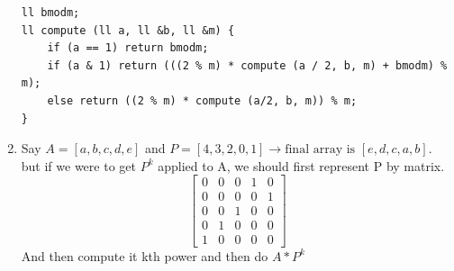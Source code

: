\documentclass[8pt, a4paper, oneside, twocolumn]{extarticle}
\begin{document}
\begin{enumerate}
\begin{verbatim}
ll bmodm;
ll compute (ll a, ll &b, ll &m) {
    if (a == 1) return bmodm;
    if (a & 1) return (((2 % m) * compute (a / 2, b, m) + bmodm) % m);
    else return ((2 % m) * compute (a/2, b, m)) % m;
}
\end{verbatim}
    \item Say $A = [a, b, c, d, e]$ and $P = [4, 3, 2, 0, 1] \rightarrow \text{final array is } [e, d, c, a, b]$. but if we were to get $P^k$ applied to A, we should first represent P by matrix.
    \[\begin{bmatrix}
    0 & 0 & 0 & 1 & 0\\
    0 & 0 & 0 & 0 & 1\\
    0 & 0 & 1 & 0 & 0\\
    0 & 1 & 0 & 0 & 0\\
    1 & 0 & 0 & 0 & 0
    \end{bmatrix}\]
    And then compute it kth power and then do $A * P^k$
\end{enumerate}
\end{document}
